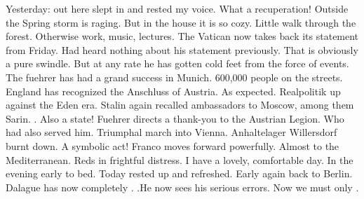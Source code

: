 Yesterday: out here slept in and rested my voice. What a recuperation! Outside the Spring storm is raging. But in the house it is so cozy. Little walk through the forest. Otherwise work, music, lectures. The Vatican now takes back its statement from Friday. Had heard nothing about his statement previously. That is obviously a pure swindle. But at any rate he has gotten cold feet from the force of events. The fuehrer has had a grand success in Munich. 600,000 people on the streets. England has recognized the Anschluss of Austria. As expected. Realpolitik up against the Eden era. Stalin again recalled ambassadors to Moscow, among them Sarin. . Also a state! Fuehrer directs a thank-you to the Austrian Legion. Who had also served him. Triumphal march into Vienna. Anhaltelager Willersdorf burnt down. A symbolic act! Franco moves forward powerfully. Almost to the Mediterranean. Reds in frightful distress. I have a lovely, comfortable day. In the evening early to bed. Today rested up and refreshed. Early again back to Berlin. Dalague has now completely . .He now sees his serious errors. Now we must only .
